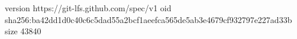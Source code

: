 version https://git-lfs.github.com/spec/v1
oid sha256:ba42dd1d0c40c6c5dad55a2bcf1aeefca565de5ab3e4679cf932797e227ad33b
size 43840
